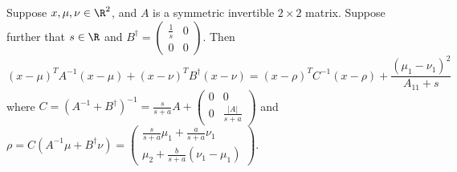 \documentclass{article}
\begin{document}
\begin{fact} \label{sum_of_normal}
Suppose $x,\mu,\nu\in\R^2$, and $A$ is a symmetric invertible $2\times 2$ matrix. Suppose further that $s\in\R$ and $B^\dagger = \left(\begin{array}{cc} \frac{1}{s} & 0 \\ 0 & 0 \end{array}\right)$. Then 
\begin{equation}
(x-\mu)^TA^{-1}(x-\mu)+(x-\nu)^TB^{\dagger}(x-\nu)=(x-\rho)^TC^{-1}(x-\rho)+\frac{(\mu_1-\nu_1)^2}{A_{11}+s}
\end{equation}
where $C=(A^{-1}+B^{\dagger})^{-1}=\frac{s}{s+a}A+\left(\begin{array}{cc} 0 & 0 \\ 0 & \frac{|A|}{s+a}\end{array}\right)$ and $\rho=C(A^{-1}\mu+B^\dagger\nu)=\left(\begin{array}{c}\frac{s}{s+a}\mu_1+\frac{a}{s+a}\nu_1 \\ \mu_2+\frac{b}{s+a}(\nu_1-\mu_1) \end{array}\right)$.
\end{fact}
\end{document}
